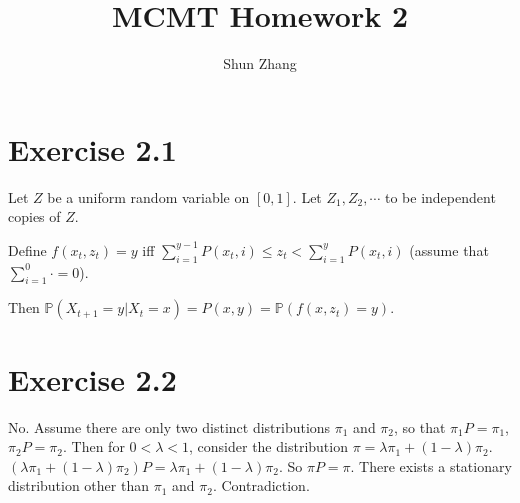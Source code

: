 \documentclass[10pt]{article}
\title{MCMT Homework 2}
\author{Shun Zhang}
\date{}
\renewcommand{\P}{\mathbb{P}}
\begin{document}
\maketitle

\section*{Exercise 2.1}

Let $Z$ be a uniform random variable on $[0, 1]$. Let $Z_1, Z_2, \cdots$ to be
independent copies of $Z$.

Define $f(x_t, z_t) = y$ iff $\sum_{i=1}^{y-1} P(x_t, i) \leq z_t <
\sum_{i=1}^{y} P(x_t, i)$ (assume that $\sum_{i=1}^0 \cdot = 0$).

Then $\P(X_{t+1} = y | X_t = x) = P(x, y) = \P(f(x, z_t) = y)$.

\section*{Exercise 2.2}

No. Assume there are only two distinct distributions $\pi_1$ and $\pi_2$, so
that $\pi_1 P = \pi_1$, $\pi_2 P = \pi_2$. Then for $0 < \lambda < 1$, consider
the distribution $\pi = \lambda \pi_1 + (1 - \lambda) \pi_2$. $(\lambda \pi_1 +
(1 - \lambda) \pi_2) P = \lambda \pi_1 + (1 - \lambda) \pi_2$. So $\pi P = \pi$.
There exists a stationary distribution other than $\pi_1$ and $\pi_2$.
Contradiction.
\end{document}
